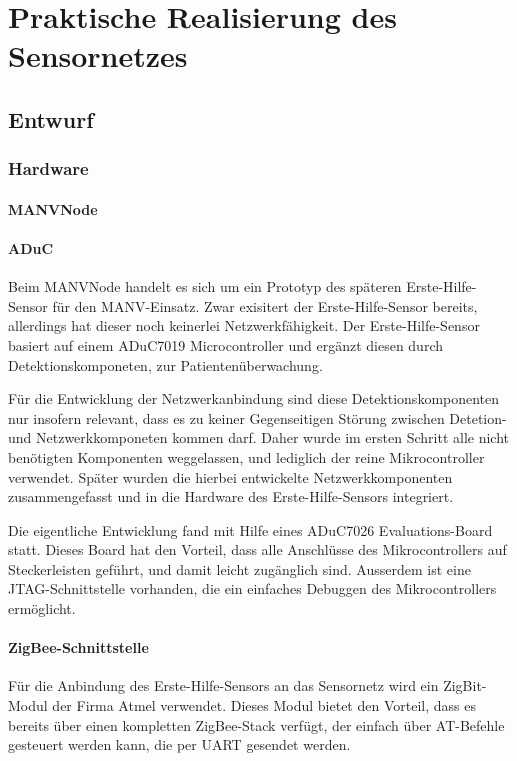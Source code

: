 
\chapter{Praktische Realisierung des Sensornetzes}

\section{Entwurf}

\subsection{Hardware}
\subsubsection{MANVNode}

\subsubsection{ADuC}
Beim MANVNode handelt es sich um ein Prototyp des späteren Erste-Hilfe-Sensor für den MANV-Einsatz. Zwar exisitert der 
Erste-Hilfe-Sensor bereits, allerdings hat dieser noch keinerlei Netzwerkfähigkeit. Der Erste-Hilfe-Sensor basiert
auf einem ADuC7019 Microcontroller und ergänzt diesen durch Detektionskomponeten, zur Patientenüberwachung.

Für die Entwicklung der Netzwerkanbindung sind diese Detektionskomponenten nur insofern relevant, dass es zu keiner
Gegenseitigen Störung zwischen Detetion- und Netzwerkkomponeten kommen darf. Daher wurde im ersten Schritt alle nicht
benötigten Komponenten weggelassen, und lediglich der reine Mikrocontroller verwendet. Später wurden die hierbei
entwickelte Netzwerkkomponenten zusammengefasst und in die Hardware des Erste-Hilfe-Sensors integriert.

Die eigentliche Entwicklung fand mit Hilfe eines ADuC7026 Evaluations-Board statt. Dieses Board hat den Vorteil, 
dass alle Anschlüsse des Mikrocontrollers auf Steckerleisten geführt, und damit leicht zugänglich sind. Ausserdem
ist eine JTAG-Schnittstelle vorhanden, die ein einfaches Debuggen des Mikrocontrollers ermöglicht.

\subsubsection{ZigBee-Schnittstelle}
Für die Anbindung des Erste-Hilfe-Sensors an das Sensornetz wird ein ZigBit-Modul der Firma Atmel verwendet. 
Dieses Modul bietet den Vorteil, dass es bereits über einen kompletten ZigBee-Stack verfügt, der einfach über
AT-Befehle gesteuert werden kann, die per UART gesendet werden.

